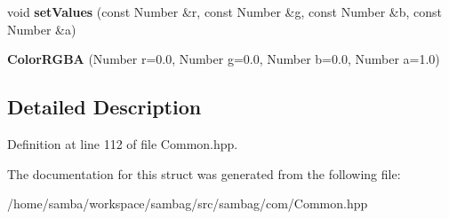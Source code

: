\begin{DoxyCompactItemize}
\item 
\hypertarget{structsambag_1_1com_1_1_color_r_g_b_a_a1fd195367ff8404bde2e1c738310e825}{
void {\bfseries setValues} (const Number \&r, const Number \&g, const Number \&b, const Number \&a)}
\label{structsambag_1_1com_1_1_color_r_g_b_a_a1fd195367ff8404bde2e1c738310e825}

\item 
\hypertarget{structsambag_1_1com_1_1_color_r_g_b_a_ad774bdeb9be348e02bff1effdc8f42e1}{
{\bfseries ColorRGBA} (Number r=0.0, Number g=0.0, Number b=0.0, Number a=1.0)}
\label{structsambag_1_1com_1_1_color_r_g_b_a_ad774bdeb9be348e02bff1effdc8f42e1}

\end{DoxyCompactItemize}


\subsection{Detailed Description}


Definition at line 112 of file Common.hpp.



The documentation for this struct was generated from the following file:\begin{DoxyCompactItemize}
\item 
/home/samba/workspace/sambag/src/sambag/com/Common.hpp\end{DoxyCompactItemize}
